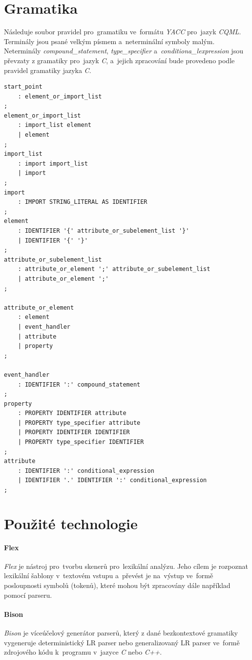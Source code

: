 \documentclass[11pt,twoside,a4paper]{book}
\begin{document}
\appendix
\chapter{\label{CH:APA}Gramatika}
Následuje soubor pravidel pro~gramatiku ve~formátu \textit{YACC} pro~jazyk \textit{CQML}. Terminály jsou psané velkým písmem a~neterminální symboly malým. Neterminály \textit{compound\_statement}, \textit{type\_specifier} a~\textit{conditiona\_lexpression} jsou převzaty z gramatiky pro~jazyk \textit{C}, a~jejich zpracování bude provedeno podle pravidel gramatiky jazyka \textit{C}.
\begin{lstlisting}[float,frame=single,caption=Gramatika jazyka \textit{CQML},label=lst:g]
start_point
	: element_or_import_list
;
element_or_import_list
	: import_list element
	| element
;
import_list
	: import import_list
	| import
;
import
	: IMPORT STRING_LITERAL AS IDENTIFIER
;
element
	: IDENTIFIER '{' attribute_or_subelement_list '}'
	| IDENTIFIER '{' '}'
;
attribute_or_subelement_list
	: attribute_or_element ';' attribute_or_subelement_list
	| attribute_or_element ';'
;

attribute_or_element
	: element
	| event_handler
	| attribute
	| property
;

event_handler
	: IDENTIFIER ':' compound_statement
;
property
	: PROPERTY IDENTIFIER attribute
	| PROPERTY type_specifier attribute
	| PROPERTY IDENTIFIER IDENTIFIER
	| PROPERTY type_specifier IDENTIFIER
;
attribute
	: IDENTIFIER ':' conditional_expression
	| IDENTIFIER '.' IDENTIFIER ':' conditional_expression
;
\end{lstlisting}

\clearpage
\chapter{\label{CH:APB}Použité technologie }

\subsubsection{Flex}
\textit{Flex} je nástroj pro~tvorbu skenerů pro~lexikální analýzu. Jeho cílem je rozpoznat lexikální šablony v~textovém vstupu a~převést je na~výstup ve~formě posloupnosti symbolů (tokenů), které mohou být zpracovány dále například pomocí parseru.
\subsubsection{Bison}
\textit{Bison} je víceúčelový generátor parserů, který z dané bezkontextové gramatiky vygeneruje deterministický LR parser nebo generalizovaný LR parser ve~formě zdrojového kódu k~programu v~jazyce \textit{C} nebo \textit{C++}.
\end{document}
